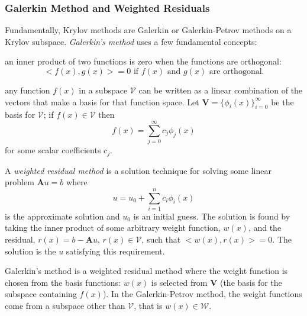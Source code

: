 \documentclass[12pt]{article}
\newcommand{\ve}[1]{\ensuremath{\mathbf{#1}}}
\begin{document}
\subsubsection*{Galerkin Method and Weighted Residuals}
Fundamentally, Krylov methods are Galerkin or Galerkin-Petrov methods on a Krylov subspace. \textit{Galerkin's method} uses a few fundamental concepts: 
\begin{compactitem}
\item an inner product of two functions is zero when the functions are orthogonal: 
\[
<f(x), g(x)> = 0\text{ if }f(x)\text{ and }g(x)\text{ are orthogonal.}
\]

\item any function $f(x)$ in a subspace $\mathcal{V}$ can be written as a linear combination of the vectors that make a basis for that function space. Let $\ve{V} = \{\phi_{i}(x) \}_{i=0}^{\infty}$ be the basis for $\mathcal{V}$; if $f(x) \in \mathcal{V}$ then 
 \[f(x) = \sum_{j=0}^{\infty} c_{j} \phi_{j}(x)\] 
 for some scalar coefficients $c_{j}$.%
  
\item A \textit{weighted residual method} is a solution technique for solving some linear problem $\ve{A}u = b$ where 
\[u = u_0 + \sum_{i=1}^{n} c_i \phi_i(x)\]
is the approximate solution and $u_{0}$ is an initial guess. The solution is found by taking the inner product of some arbitrary weight function, $w(x)$, and the residual, $r(x) = b - \ve{A}u$, $r(x) \in \mathcal{V}$, such that $<w(x), r(x)> = 0$. The solution is the $u$ satisfying this requirement. 
\end{compactitem}

Galerkin's method is a weighted residual method where the weight function is chosen from the basis functions: $w(x)$ is selected from $\ve{V}$ (the basis for the subspace containing $f(x)$). %
In the Galerkin-Petrov method, the weight functions come from a subspace other than $\mathcal{V}$, that is $w(x) \in \mathcal{W}$.%
\end{document}
